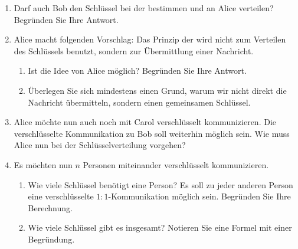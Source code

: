 \begin{enumerate}
\item Darf auch Bob den Schlüssel bei der  bestimmen und an Alice verteilen? Begründen Sie Ihre Antwort.

\fillwithgrid{1in}

\item Alice macht folgenden Vorschlag: Das Prinzip der  wird nicht zum Verteilen des Schlüssels benutzt, sondern zur Übermittlung einer Nachricht.
\begin{enumerate}
\item Ist die Idee von Alice möglich? Begründen Sie Ihre Antwort.

\fillwithgrid{2in}

\item Überlegen Sie sich mindestens einen Grund, warum wir nicht direkt die Nachricht übermitteln, sondern einen gemeinsamen Schlüssel.

\fillwithgrid{2in}

\end{enumerate}

\item Alice möchte nun auch noch mit Carol verschlüsselt kommunizieren. Die verschlüsselte Kommunikation zu Bob soll weiterhin möglich sein. Wie muss Alice nun bei der Schlüsselverteilung vorgehen?

\fillwithgrid{3in}

\item Es möchten nun $n$ Personen miteinander verschlüsselt kommunizieren.

\begin{enumerate}
\item Wie viele Schlüssel benötigt eine Person? Es soll zu jeder anderen Person eine verschlüsselte $1:1$-Kommunikation möglich sein. Begründen Sie Ihre Berechnung.

\fillwithgrid{1in}

\item Wie viele Schlüssel gibt es insgesamt? Notieren Sie eine Formel mit einer Begründung.

\fillwithgrid{1in}

\end{enumerate}

\end{enumerate}
